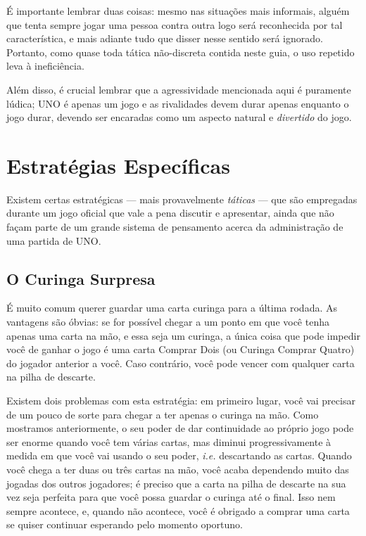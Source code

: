 É importante lembrar duas coisas: mesmo nas situações mais informais, alguém que tenta sempre jogar uma pessoa contra outra logo será reconhecida por tal característica, e mais adiante tudo que disser nesse sentido será ignorado. Portanto, como quase toda tática não-discreta contida neste guia, o uso repetido leva à ineficiência.

Além disso, é crucial lembrar que a agressividade mencionada aqui é puramente lúdica; UNO é apenas um jogo e as rivalidades devem durar apenas enquanto o jogo durar, devendo ser encaradas como um aspecto natural e \textit{divertido} do jogo.

\section{Estratégias Específicas}

\label{estesp}

Existem certas estratégicas --- mais provavelmente \textit{táticas} --- que são empregadas durante um jogo oficial que vale a pena discutir e apresentar, ainda que não façam parte de um grande sistema de pensamento acerca da administração de uma partida de UNO.

\subsection{O Curinga Surpresa}

\label{curingasurpresa}

É muito comum querer guardar uma carta curinga para a última rodada. As vantagens são óbvias: se for possível chegar a um ponto em que você tenha apenas uma carta na mão, e essa seja um curinga, a única coisa que pode impedir você de ganhar o jogo é uma carta Comprar Dois (ou Curinga Comprar Quatro) do jogador anterior a você. Caso contrário, você pode vencer com qualquer carta na pilha de descarte.

Existem dois problemas com esta estratégia: em primeiro lugar, você vai precisar de um pouco de sorte para chegar a ter apenas o curinga na mão. Como mostramos anteriormente, o seu poder de dar continuidade ao próprio jogo pode ser enorme quando você tem várias cartas, mas diminui progressivamente à medida em que você vai usando o seu poder, \textit{i.e.} descartando as cartas. Quando você chega a ter duas ou três cartas na mão, você acaba dependendo muito das jogadas dos outros jogadores; é preciso que a carta na pilha de descarte na sua vez seja perfeita para que você possa guardar o curinga até o final. Isso nem sempre acontece, e, quando não acontece, você é obrigado a comprar uma carta se quiser continuar esperando pelo momento oportuno.

